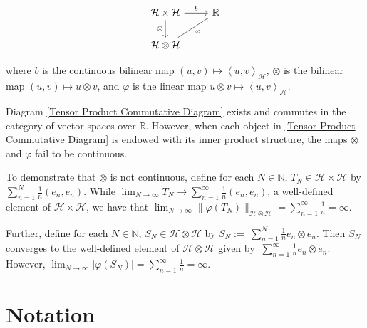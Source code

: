 \documentclass{article}
\numberwithin{theorem}{section}
\numberwithin{lemma}{section}
\numberwithin{definition}{section}
\numberwithin{assumption}{section}
\numberwithin{proposition}{section}
\numberwithin{remark}{section}
\numberwithin{corollary}{section}
\numberwithin{conjecture}{section}
\numberwithin{example}{section}
\newcommand{\R}{\mathbb{R}}
\newcommand{\N}{\mathbb{N}}
\newcommand{\aset}[1]{\left \langle #1 \right \rangle}
\newcommand{\CH}{\mathcal H}
\begin{document}
\begin{multicols*}{2}
\begin{equation} \label{Tensor Product Commutative Diagram}
\begin{tikzcd} 
\CH \times \CH \arrow[r, "b"] \arrow[d, "\otimes"'] & \R \\
\CH \otimes \CH \arrow[ur, "\varphi"'] & 
\end{tikzcd}
\end{equation}

where $b$ is the continuous bilinear map $(u,v) \mapsto \aset{u,v}_\CH$, $\otimes$ is the bilinear map $(u,v) \mapsto u \otimes v$, and $\varphi$ is the linear map $u \otimes v  \mapsto \aset{u,v}_\CH$. 

Diagram \ref{Tensor Product Commutative Diagram} exists and commutes in the category of vector spaces over $\R$. However, when each object in \ref{Tensor Product Commutative Diagram} is endowed with its inner product structure, the maps $\otimes$ and $\varphi$ fail to be continuous. 

To demonstrate that $\otimes$ is not continuous, define for each $N \in \N$,  $T_N \in 
\CH \times \CH$ by $\sum_{n=1}^N \frac{1}{n} (e_n, e_n)$. While $ \lim_{N \to \infty} T_N \to \sum_{n=1}^\infty \tfrac 1 n (e_n, e_n)$, a well-defined element of $\CH \times \CH$, we have that $\lim_{N \to \infty} \|\varphi(T_N)\|_{\CH \otimes \CH} = \sum_{n=1}^\infty \tfrac 1 n = \infty$. 

Further, define for each $N \in \N$, $S_N \in \CH \otimes \CH$ by $S_N := \ \sum_{n=1}^N \frac 1 n e_n \otimes e_n$. Then $S_N$ converges to the well-defined element of $\CH \otimes \CH$ given by $\ \sum_{n=1}^\infty  \frac 1 n e_n \otimes e_n $. However, $\lim_{N \to \infty} |\varphi(S_N)| = \sum_{n=1}^\infty \frac 1 n = \infty$. 

\newpage 

\section{Notation} \label{Notation}


\end{multicols*}
\end{document}
